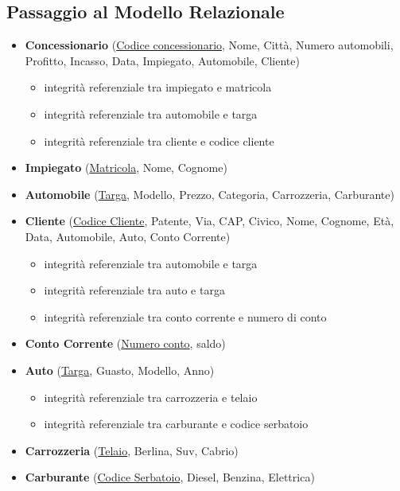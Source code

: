 \documentclass[12pt,a4paper]{article}
\begin{document}
\subsection{Passaggio al Modello Relazionale}
\begin{itemize}
	\item \textbf{Concessionario} (\underline{Codice concessionario}, Nome, Città, Numero automobili, Profitto, Incasso, Data, Impiegato, Automobile, Cliente)
	\begin{itemize}
		\item integrità referenziale tra impiegato e matricola
		\item integrità referenziale tra automobile e targa
		\item integrità referenziale tra cliente e codice cliente
	\end{itemize}
	\item \textbf{Impiegato} (\underline{Matricola}, Nome, Cognome)
	\item \textbf{Automobile} (\underline{Targa}, Modello, Prezzo, Categoria, Carrozzeria, Carburante)
	\item \textbf{Cliente} (\underline{Codice Cliente}, Patente, Via, CAP, Civico, Nome, Cognome, Età, Data, Automobile, Auto, Conto Corrente)
	\begin{itemize}
		\item integrità referenziale tra automobile e targa
		\item integrità referenziale tra auto e targa
		\item integrità referenziale tra conto corrente e numero di conto
	\end{itemize}
	
	\item \textbf{Conto Corrente} (\underline{Numero conto}, saldo)
	\item \textbf{Auto} (\underline{Targa}, Guasto, Modello, Anno)
	\begin{itemize}
		\item integrità referenziale tra carrozzeria e telaio
		\item integrità referenziale tra carburante e codice serbatoio
	\end{itemize}
	\item \textbf{Carrozzeria} (\underline{Telaio}, Berlina, Suv, Cabrio)
	\item \textbf{Carburante} (\underline{Codice Serbatoio}, Diesel, Benzina, Elettrica)
	
\end{itemize}
\end{document}
